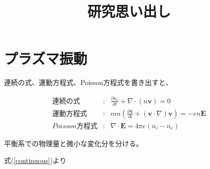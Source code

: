 \documentclass[18pt]{jsarticle}
\title{研究思い出し}
\begin{document}
\section{プラズマ振動}
\par 連続の式、運動方程式、Poisson方程式を書き出すと、

\begin{eqnarray}
    \label{continuous} 連続の式 &:& \frac{\partial n_e}{\partial t}+
        \nabla\cdot (n\bm{v}) = 0 \\
    \label{motion} 運動方程式 &:& mn\left( \frac{\partial \bm{v}}{\partial t}+(\bm{v}\cdot\nabla)\bm{v}\right) = -en\bm{E} \\
    \label{poisson} Poisson方程式 &:& \nabla\cdot\bm{E}=4\pi e(n_i-n_e)
\end{eqnarray}

\par 平衡系での物理量と微小な変化分を分ける。

式(\ref{continuous})より
\begin{eqnarray}


\end{eqnarray}
\end{document}

